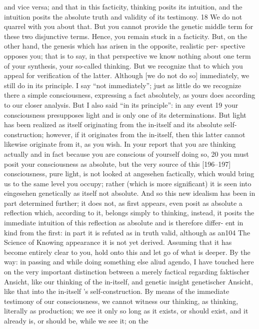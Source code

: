 and vice versa; and that in this facticity, thinking posits its intuition, and the
intuition posits the absolute truth and validity of its testimony. 18 We do not
quarrel with you about that. But you cannot provide the genetic middle term
for these two disjunctive terms. Hence, you remain stuck in a facticity. But,
on the other hand, the genesis which has arisen in the opposite, realistic per-
spective opposes you; that is to say, in that perspective we know nothing
about one term of your synthesis, your so-called thinking. But we recognize
that to which you appeal for verification of the latter. Although [we do not
do so] immediately, we still do in its principle. I say “not immediately”; just as
little do we recognize there a simple consciousness, expressing a fact
absolutely, as yours does according to our closer analysis. But I also said “in
its principle”: in any event 19 your consciousness presupposes light and is only
one of its determinations. But light has been realized as itself originating
from the in-itself and its absolute self-construction; however, if it originates
from the in-itself, then this latter cannot likewise originate from it, as you
wish. In your report that you are thinking actually and in fact because you are
conscious of yourself doing so, 20 you must posit your consciousness as
absolute, but the very source of this [196–197] consciousness, pure light, is
not looked at {angesehen} factically, which would bring us to the same level
you occupy; rather (which is more significant) it is seen into {eingesehen}
genetically as itself not absolute. And so this new idealism has been in part
determined further; it does not, as first appears, even posit as absolute a
reflection which, according to it, belongs simply to thinking, instead, it posits
the immediate intuition of this reflection as absolute and is therefore differ-
ent in kind from the first: in part it is refuted as in truth valid, although as an104
The Science of Knowing
appearance it is not yet derived. Assuming that it has become entirely clear
to you, hold onto this and let go of what is deeper.
By the way: in passing and while doing something else {aliud agendo}, I
have touched here on the very important distinction between a merely factical
regarding {faktischer Ansicht}, like our thinking of the in-itself, and genetic
insight {genetischer Ansicht}, like that into the in-itself ’s self-construction. By
means of the immediate testimony of our consciousness, we cannot witness
our thinking, as thinking, literally as production; we see it only so long as it
exists, or should exist, and it already is, or should be, while we see it; on the
